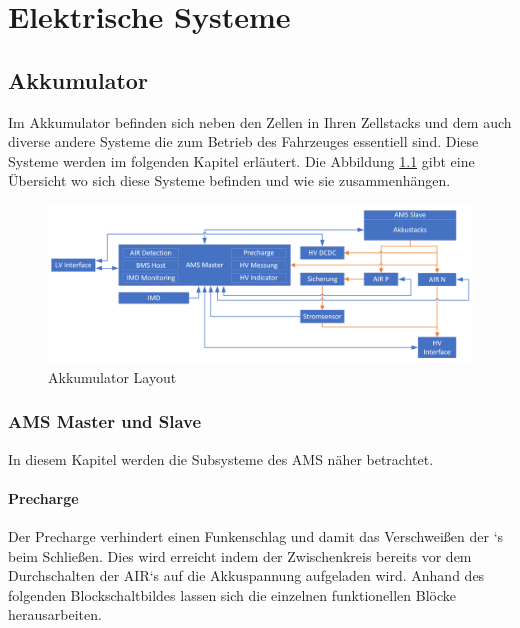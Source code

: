 
\chapter{Elektrische Systeme}
\FloatBarrier
\section{Akkumulator}
Im Akkumulator befinden sich neben den Zellen in Ihren Zellstacks und dem  auch diverse andere Systeme die zum Betrieb des Fahrzeuges essentiell sind. Diese Systeme werden im folgenden Kapitel erläutert. Die Abbildung \ref{fig:accumulator-layout} gibt eine Übersicht wo sich diese Systeme befinden und wie sie zusammenhängen.

\begin{figure}
	\centering
	\includegraphics[width=0.9\linewidth]{"bilder/Accumulator Layout"}
	\caption{Akkumulator Layout}
	\label{fig:accumulator-layout}
\end{figure}

\FloatBarrier
\subsection{\ac{AMS} Master und Slave}
In diesem Kapitel werden die Subsysteme des \ac{AMS} näher betrachtet.
\FloatBarrier

\subsubsection{Precharge}
Der Precharge verhindert einen Funkenschlag und damit das Verschweißen der `s beim Schließen. Dies wird erreicht indem der Zwischenkreis bereits vor dem Durchschalten der \ac{AIR}`s auf die Akkuspannung aufgeladen wird. Anhand des folgenden Blockschaltbildes lassen sich die einzelnen funktionellen Blöcke herausarbeiten.

